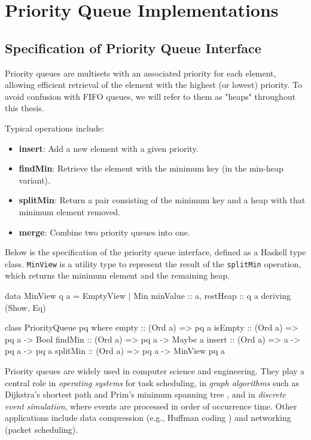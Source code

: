 \chapter{Priority Queue Implementations}
\label{ch:implementations}
\section{Specification of Priority Queue Interface}

Priority queues are multisets with an associated priority for each element, allowing efficient retrieval of the element with the highest (or lowest) priority.
To avoid confusion with FIFO queues, we will refer to them as "heaps" throughout this thesis.

Typical operations include:
\begin{itemize}
	\item \textbf{insert}: Add a new element with a given priority.
	\item \textbf{findMin}: Retrieve the element with the minimum key (in the min-heap variant).
	\item \textbf{splitMin}: Return a pair consisting of the minimum key and a heap with that minimum element removed.
	\item \textbf{merge}: Combine two priority queues into one.
\end{itemize}

Below is the specification of the priority queue interface, defined as a Haskell type class.
\texttt{MinView} is a utility type to represent the result of the \texttt{splitMin} operation,
which returns the minimum element and the remaining heap.

\begin{code}[caption={Leftist Heap Implementation in Haskell}, label={lst:pq}]

	data MinView q a =
	  EmptyView | Min {minValue :: a, restHeap :: q a}
	  deriving (Show, Eq)

	class PriorityQueue pq where
    empty :: (Ord a) => pq a
    isEmpty :: (Ord a) => pq a -> Bool
    findMin :: (Ord a) => pq a -> Maybe a
    insert :: (Ord a) => a -> pq a -> pq a
    splitMin :: (Ord a) => pq a -> MinView pq a
\end{code}

Priority queues are widely used in computer science and engineering.
They play a central role in \emph{operating systems} for task scheduling, in \emph{graph algorithms} such as Dijkstra’s shortest path \cite{Dijkstra59} and Prim’s minimum spanning tree \cite{Prim57}, and in \emph{discrete event simulation},
where events are processed in order of occurrence time.
Other applications include data compression (e.g., Huffman coding \cite{Huffman52}) and networking (packet scheduling).

